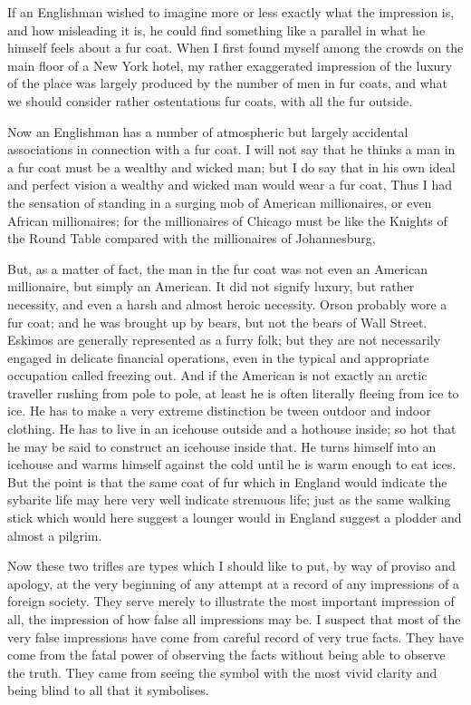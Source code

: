 \documentclass{book}
\begin{document}
If an Englishman wished to imagine more or less exactly what the impression is, and how misleading it is, he could find something like a parallel in what he himself feels about a fur coat. When I first found myself among the crowds on the main floor of a New York hotel, my rather exaggerated impression of the luxury of the place was largely produced by the number of men in fur coats, and what we should consider rather ostentatious fur coats, with all the fur outside.

Now an Englishman has a number of atmospheric but largely accidental associations in connection with a fur coat. I will not say that he thinks a man in a fur coat must be a wealthy and wicked man; but I do say that in his own ideal and perfect vision a wealthy and wicked man would wear a fur coat, Thus I had the sensation of standing in a surging mob of American millionaires, or even African millionaires; for the millionaires of Chicago must be like the Knights of the Round Table compared with the millionaires of Johannesburg,

But, as a matter of fact, the man in the fur coat was not even an American millionaire, but simply an American. It did not signify luxury, but rather necessity, and even a harsh and almost heroic necessity. Orson probably wore a fur coat; and he was brought up by bears, but not the bears of Wall Street. Eskimos are generally represented as a furry folk; but they are not necessarily engaged in delicate financial operations, even in the typical and appropriate occupation called freezing out. And if the American is not exactly an arctic traveller rushing from pole to pole, at least he is often literally fleeing from ice to ice. He has to make a very extreme distinction be tween outdoor and indoor clothing. He has to live in an icehouse outside and a hothouse inside; so hot that he may be said to construct an icehouse inside that. He turns himself into an icehouse and warms himself against the cold until he is warm enough to eat ices. But the point is that the same coat of fur which in England would indicate the sybarite life may here very well indicate strenuous life; just as the same walking stick which would here suggest a lounger would in England suggest a plodder and almost a pilgrim.

Now these two trifles are types which I should like to put, by way of proviso and apology, at the very beginning of any attempt at a record of any impressions of a foreign society. They serve merely to illustrate the most important impression of all, the impression of how false all impressions may be. I suspect that most of the very false impressions have come from careful record of very true facts. They have come from the fatal power of observing the facts without being able to observe the truth. They came from seeing the symbol with the most vivid clarity and being blind to all that it symbolises.
\end{document}

